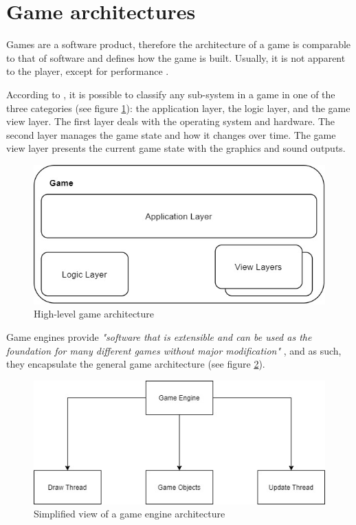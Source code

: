 \documentclass[runningheads]{llncs}
\begin{document}
\section{Game architectures} \label{sec:game-architecture}
Games are a  software product, therefore the  architecture of a game is comparable to that of software and defines how the game is built. Usually, it is not apparent to the player, except for performance \cite{croft_2004}.

According to \cite{mcshaffry_2009}, it is possible to classify any sub-system in a game in one of the three categories (see figure \ref{fig:highArchitecture}): the application layer, the logic layer, and the game view layer. The first layer deals with the operating system and hardware. The second layer manages the game state and how it changes over time. The game view layer presents the current game state with the graphics and sound outputs.

\begin{figure}[!h]
    \centering
    \includegraphics[scale=0.5]{src/hci2020-images/GameArchitecture.jpg}
    \caption{High-level game architecture}
    \label{fig:highArchitecture}
\end{figure}

Game engines provide \textit{"software that is extensible and can be used as the foundation for many different games without major modification"} \cite{gregory_2019}, and as such, they encapsulate the general game architecture (see figure \ref{fig:Simplified_game_engine}).

\begin{figure}[!h]
    \centering
    \includegraphics[scale=0.5]{src/hci2020-images/GameEngineArchitecture.jpg}
    \caption{Simplified view of a game engine architecture}
    \label{fig:Simplified_game_engine}
\end{figure}
\end{document}
